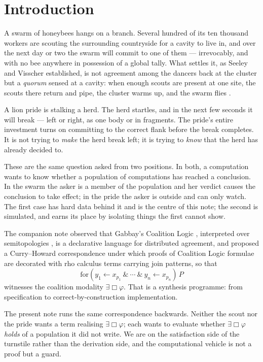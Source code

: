 \documentclass[11pt,a4paper]{article}
\theoremstyle{plain}
\theoremstyle{definition}
\theoremstyle{remark}
\newcommand{\Ebox}{\exists\Box}
\begin{document}
\section{Introduction}\label{sec:intro}

A swarm of honeybees hangs on a branch. Several hundred of its ten thousand
workers are scouting the surrounding countryside for a cavity to live in, and
over the next day or two the swarm will commit to one of them --- irrevocably,
and with no bee anywhere in possession of a global tally. What settles it, as
Seeley and Visscher established, is not agreement among the dancers back at the
cluster but a \emph{quorum} sensed at a cavity: when enough scouts are present
at one site, the scouts there return and pipe, the cluster warms up, and the
swarm flies \cite{SV04,Seeley10}.

A lion pride is stalking a herd. The herd startles, and in the next few seconds
it will break --- left or right, as one body or in fragments. The pride's entire
investment turns on committing to the correct flank before the break completes.
It is not trying to \emph{make} the herd break left; it is trying to
\emph{know} that the herd has already decided to.

These are the same question asked from two positions. In both, a computation
wants to know whether a population of computations has reached a conclusion. In
the swarm the asker is a member of the population and her verdict causes the
conclusion to take effect; in the pride the asker is outside and can only watch.
The first case has hard data behind it and is the centre of this note; the
second is simulated, and earns its place by isolating things the first cannot
show.

The companion note \cite{consensus} observed that Gabbay's Coalition Logic
\cite{GZ25,Gab25}, interpreted over semitopologies \cite{Gab23,Gab24}, is a
declarative language for distributed agreement, and proposed a Curry--Howard
correspondence under which proofs of Coalition Logic formulae are decorated with
rho calculus terms carrying join patterns, so that
\[
\mathrm{for}(y_1 \leftarrow x_{p_1}\ \&\ \cdots\ \&\ y_n \leftarrow x_{p_n})\,P
\]
witnesses the coalition modality $\Ebox\varphi$. That is a synthesis programme:
from specification to correct-by-construction implementation.

The present note runs the same correspondence backwards. Neither the scout nor
the pride wants a term realising $\Ebox\varphi$; each wants to evaluate whether
$\Ebox\varphi$ \emph{holds} of a population it did not write. We are on the
satisfaction side of the turnstile rather than the derivation side, and the
computational vehicle is not a proof but a guard.
\end{document}

